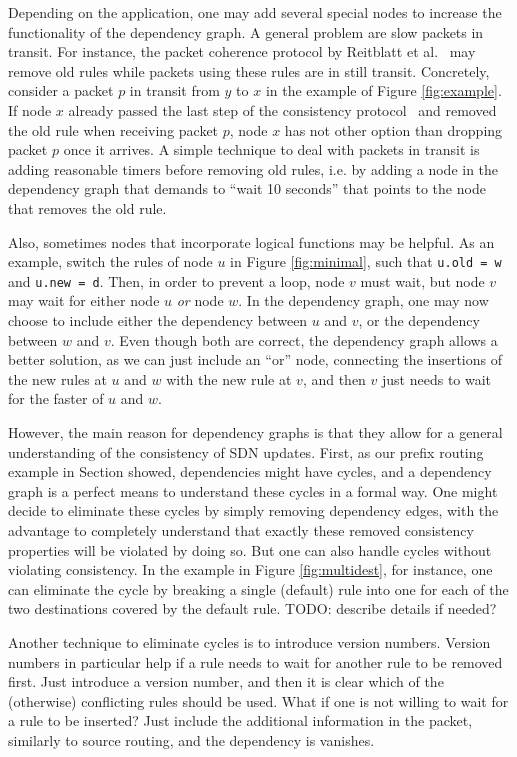 Depending on the application, one may add several special nodes to increase the functionality of the dependency graph. A general problem are slow packets in transit. For instance, the packet coherence protocol by Reitblatt et al.~\cite{safeupdates} may remove old rules while packets using these rules are in still transit. Concretely, consider a packet $p$ in transit from $y$ to $x$ in the example of Figure \ref{fig:example}. If node $x$ already passed the last step of the consistency protocol~\cite{safeupdates} and removed the old rule when receiving packet $p$, node $x$ has not other option than dropping packet $p$ once it arrives. A simple technique to deal with packets in transit is adding reasonable timers before removing old rules, i.e. by adding a node in the dependency graph that demands to ``wait 10 seconds'' that points to the node that removes the old rule.

Also, sometimes nodes that incorporate logical functions may be helpful. As an example, switch the rules of node $u$ in Figure \ref{fig:minimal}, such that \texttt{u.old = w} and \texttt{u.new = d}. Then, in order to prevent a loop, node $v$ must wait, but node $v$ may wait for either node $u$ \emph{or} node $w$. In the dependency graph, one may now choose to include either the dependency between $u$ and $v$, or the dependency between $w$ and $v$. Even though both are correct, the dependency graph allows a better solution, as we can just include an ``or'' node, connecting the insertions of the new rules at $u$ and $w$ with the new rule at $v$, and then $v$ just needs to wait for the faster of $u$ and $w$.

However, the main reason for dependency graphs is that they allow for a general understanding of the consistency of SDN updates. First, as our prefix routing example in Section \label{ref:multidest} showed, dependencies might have cycles, and a dependency graph is a perfect means to understand these cycles in a formal way. One might decide to eliminate these cycles by simply removing dependency edges, with the advantage to completely understand that exactly these removed consistency properties will be violated by doing so. But one can also handle cycles without violating consistency. In the example in Figure \ref{fig:multidest}, for instance, one can eliminate the cycle by breaking a single (default) rule into one for each of the two destinations covered by the default rule. TODO: describe details if needed?

Another technique to eliminate cycles is to introduce version numbers. Version numbers in particular help if a rule needs to wait for another rule to be removed first. Just introduce a version number, and then it is clear which of the (otherwise) conflicting rules should be used. What if one is not willing to wait for a rule to be inserted? Just include the additional information in the packet, similarly to source routing, and the dependency is vanishes.

